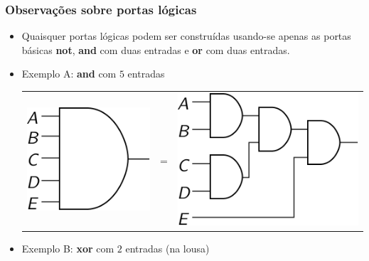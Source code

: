 \documentclass{beamer}
\begin{document}
\begin{frame}
\frametitle{Observações sobre portas lógicas}

\begin{itemize}
\item Quaisquer portas lógicas podem ser construídas usando-se apenas as portas básicas \textbf{not}, \textbf{and} com duas entradas e \textbf{or} com duas entradas.
\pause
\item Exemplo A: \textbf{and} com $5$ entradas

\hspace{3ex}
\begin{tabular}{m{20ex}m{6ex}m{24ex}}
\includegraphics{images/and5_gate} \pause & {\Huge =} & \includegraphics{images/and5_circ}
\\[12pt]
\end{tabular}
\pause
\item Exemplo B: \textbf{xor} com $2$ entradas (na lousa)
\end{itemize}


\end{frame}

\end{document}
